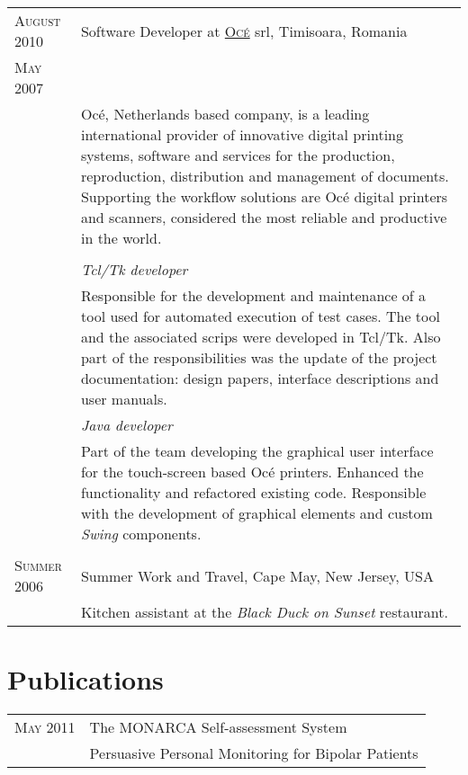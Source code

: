 \documentclass[a4paper,10pt]{article}
\begin{document}
\begin{tabular}{p{2.5cm}|p{11cm}}
 \raggedleft \textsc{August 2010} & Software Developer at \textsc{\href{http://www3.oce.com/ro/}{Oc\'e}} srl, Timisoara, Romania
 \\\raggedleft \textsc{May 2007}\\& 
 \footnotesize{Oc\'e, Netherlands based company, is a leading international
 provider of innovative digital printing systems, software
 and services for the production, reproduction, distribution and management of
 documents. Supporting the workflow solutions are Oc\'e digital  printers and
 scanners, considered the most reliable and productive in the world.}\\ \\ 
 &\emph{Tcl/Tk developer}\\
 &\footnotesize{Responsible for the development and maintenance of a tool
 used for automated execution of test cases. The tool and the associated scrips
 were developed in Tcl/Tk. Also part of the responsibilities was the update of
 the project documentation: design papers, interface descriptions and user
 manuals.}\\ 
 &\emph{Java developer}\\&\footnotesize{Part of the team developing the 
 graphical user interface for the touch-screen based Oc\'e printers. Enhanced
 the functionality and refactored existing code. Responsible with the development
 of graphical elements and custom \emph{Swing} components.} 
 \\\multicolumn{2}{c}{} \\ 
 \raggedleft \textsc{Summer 2006} & Summer Work and Travel, Cape May, New
 Jersey, USA\\&\footnotesize{Kitchen assistant at the \emph{Black Duck on Sunset} restaurant.}
\end{tabular}

\section{Publications}
\begin{tabular}{p{2.5cm}|p{11cm}}

 \raggedleft \textsc{May 2011} & The MONARCA Self-assessment System \\
 & Persuasive Personal Monitoring for Bipolar Patients \\
\end{tabular}

\end{document}
